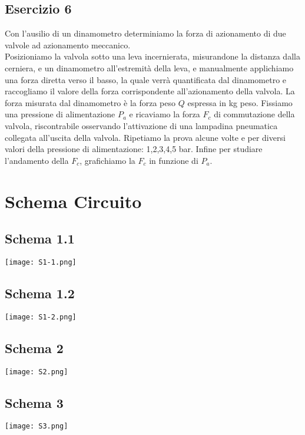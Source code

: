 \documentclass[a4paper]{article}
\begin{document}
\subsection{Esercizio 6}
Con l'ausilio di un dinamometro determiniamo la forza di azionamento di due \\
valvole ad azionamento meccanico.\\
 Posizioniamo la valvola sotto una leva incernierata, misurandone la distanza dalla cerniera, e un dinamometro all'estremità della leva, e manualmente applichiamo una forza diretta verso il basso, la quale verrà quantificata dal dinamometro e raccogliamo il valore della forza corrispondente all'azionamento della valvola. La forza misurata dal dinamometro è la forza peso $Q$ espressa in kg peso. Fissiamo una pressione di alimentazione $P_a$ e ricaviamo la forza $F_c$ di commutazione della valvola, riscontrabile osservando l'attivazione di una lampadina pneumatica collegata all'uscita della valvola. Ripetiamo la prova alcune volte e per diversi valori della pressione di alimentazione: 1,2,3,4,5 bar.
Infine per studiare l'andamento della $F_c$, grafichiamo la $F_c$ in funzione di $P_a$.

\section{Schema Circuito}

\subsection{Schema 1.1}
\begin{center}
\texttt{[image: S1-1.png]}
\end{center}

\subsection{Schema 1.2}
\begin{center}
\texttt{[image: S1-2.png]}
\end{center}

\subsection{Schema 2}
\begin{center}
\texttt{[image: S2.png]}
\end{center}

\subsection{Schema 3}
\begin{center}
\texttt{[image: S3.png]}
\end{center}
\end{document}
